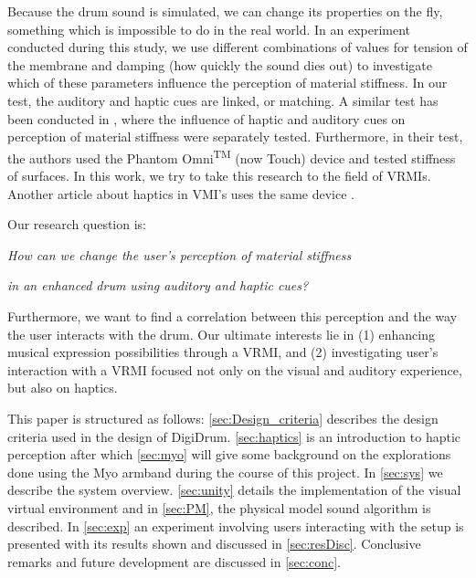 \documentclass{vgtc}
\begin{document}
Because the drum sound is simulated, we can change its properties on the fly, something which is impossible to do in the real world. In an experiment conducted during this study, we use different combinations of values for tension of the membrane and damping (how quickly the sound dies out) to investigate which of these parameters influence the perception of material stiffness. In our test, the auditory and haptic cues are linked, or matching. A similar test has been conducted in \cite{avanzini2006}, where the influence of haptic and auditory cues on perception of material stiffness were separately tested. Furthermore, in their test, the authors used the Phantom\textregistered{} Omni\textsuperscript{TM} (now Touch) \cite{phantom} device and tested stiffness of surfaces. In this work, we try to take this research to the field of VRMIs. Another article about haptics in VMI's uses the same device \cite{passalenti2019}.

Our research question is:
\vspace{0.2cm}

\centerline{\it How can we change the user's perception of material stiffness}

\centerline{\it in an enhanced drum using auditory and haptic cues?}
\vspace{0.2cm}
\noindent Furthermore, we want to find a correlation between this perception and the way the user interacts with the drum. Our ultimate interests lie in (1) enhancing musical expression possibilities through a VRMI, and (2) investigating user's interaction with a VRMI focused not only on the visual and auditory experience, but also on haptics.

This paper is structured as follows: \autoref{sec:Design_criteria} describes the design criteria used in the design of DigiDrum.
\autoref{sec:haptics} is an introduction to haptic perception after which \autoref{sec:myo} will give some background on the explorations done using the Myo armband \cite{myowebsite} during the course of this project. In \autoref{sec:sys} we describe the system overview. \autoref{sec:unity} details the implementation of the visual virtual environment and in \autoref{sec:PM}, the physical model sound algorithm is described. 
In \autoref{sec:exp} an experiment involving users interacting with the setup is presented with its results shown and discussed in \autoref{sec:resDisc}. Conclusive remarks and future development are discussed in \autoref{sec:conc}.
\end{document}

